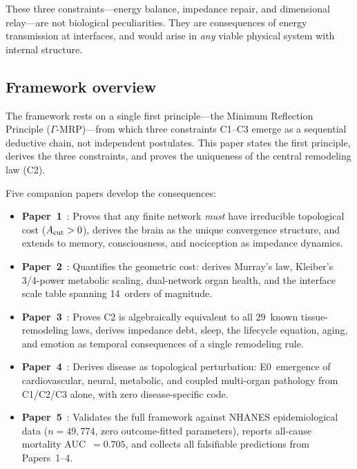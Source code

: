 \documentclass[aps,pre,twocolumn,superscriptaddress,floatfix]{revtex4-2}
\begin{document}
\medskip\noindent
These three constraints---energy balance,
impedance repair, and dimensional relay---are not
biological peculiarities.
They are consequences of energy transmission at
interfaces, and would arise in \emph{any} viable
physical system with internal structure.

\subsection*{Framework overview}

The framework rests on a single first principle---the
Minimum Reflection Principle ($\Gamma$-MRP)---from
which three constraints C1--C3 emerge as a sequential
deductive chain, not independent postulates.
This paper states the first principle, derives the
three constraints, and proves the uniqueness of the
central remodeling law (C2).

Five companion papers develop the consequences:
\begin{itemize}
  \item \textbf{Paper~1}~\cite{Paper1}:
    Proves that any finite network \emph{must} have
    irreducible topological cost ($A_{\text{cut}} > 0$),
    derives the brain as the unique convergence
    structure, and extends to memory, consciousness,
    and nociception as impedance dynamics.
  \item \textbf{Paper~2}~\cite{Paper2}:
    Quantifies the geometric cost: derives Murray's law,
    Kleiber's 3/4-power metabolic scaling, dual-network
    organ health, and the interface scale table spanning
    14~orders of magnitude.
  \item \textbf{Paper~3}~\cite{Paper3}:
    Proves C2 is algebraically equivalent to all
    29~known tissue-remodeling laws, derives impedance
    debt, sleep, the lifecycle equation, aging, and
    emotion as temporal consequences of a single
    remodeling rule.
  \item \textbf{Paper~4}~\cite{Paper4}:
    Derives disease as topological perturbation:
    E0~emergence of cardiovascular, neural, metabolic,
    and coupled multi-organ pathology from C1/C2/C3
    alone, with zero disease-specific code.
  \item \textbf{Paper~5}~\cite{Paper5}:
    Validates the full framework against NHANES
    epidemiological data ($n = 49{,}774$, zero outcome-fitted
    parameters), reports all-cause mortality
    AUC~$= 0.705$, and collects all falsifiable
    predictions from Papers~1--4.
\end{itemize}
\end{document}
